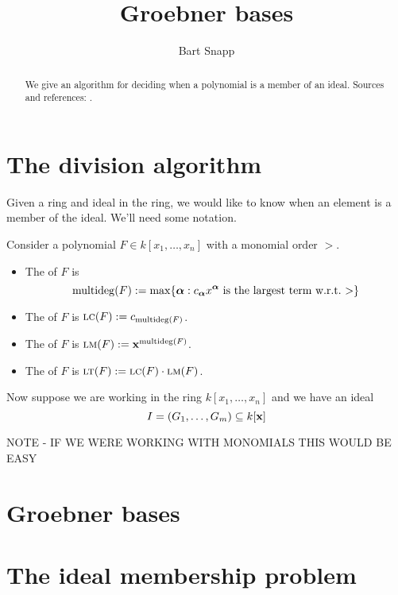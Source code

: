 \documentclass{ximera}
\title{Groebner bases}
\author{Bart Snapp}
\begin{document}
\begin{abstract}
  We give an algorithm for deciding when a polynomial is a member of
  an ideal.  Sources and references: \cite{CLO2007,hS2003}.
\end{abstract}
\maketitle


\section{The division algorithm}

Given a ring and ideal in the ring, we would like to know when an
element is a member of the ideal. We'll need some notation.


\begin{definition}
  Consider a polynomial $F\in k[x_1,\dots, x_n]$ with a monomial order
  $>$.
  \begin{itemize}
    \item The  of $F$ is
    \[
    \operatorname{multideg}(F) := \max\{{\boldsymbol\alpha}: \text{$c_{\boldsymbol\alpha} x^{\boldsymbol\alpha}$ is the largest term w.r.t.\ $>$} \}
    \]
  \item The  of $F$ is $\textsc{lc}(F) := c_{\operatorname{multideg}(F)}$.
  \item The  of $F$ is $\textsc{lm}(F) := \mathbf{x}^{\operatorname{multideg}(F)}$.
  \item The  of $F$ is $\textsc{lt}(F) := \textsc{lc}(F)\cdot \textsc{lm}(F)$.
  \end{itemize}
\end{definition}

Now suppose we are working in the ring $k[x_1,\dots, x_n]$ and we have an ideal
\[
I = (G_1,\dots, G_m) \subseteq k[\mathbf{x}]
\]


NOTE - IF WE WERE WORKING WITH MONOMIALS THIS WOULD BE EASY



\section{Groebner bases}



\section{The ideal membership problem}
\end{document}
